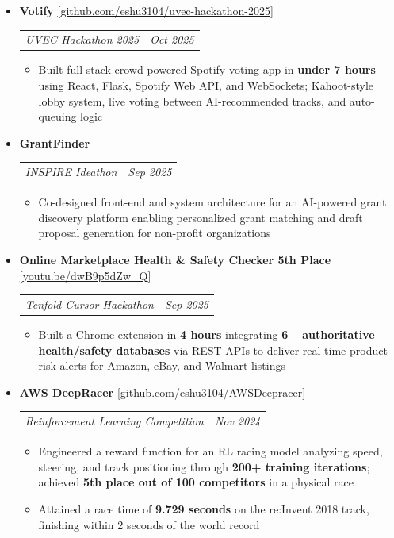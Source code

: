 \documentclass[10pt,letterpaper]{article}
\makeatletter
\newcommand{\resumeProjectHeading}[5]{%
  \vspace{5pt}%
  \item[]%
    {\small \textbf{#1} \enspace \href{#5}{\textcolor{accentblue}{[\underline{#2}]}}}\\[2pt]%
    {\small \begin{tabular*}{0.99\textwidth}{l@{\extracolsep{\fill}}r}%
      \textcolor{midgray}{\textit{\hspace{2pt}#3}} & \textcolor{midgray}{\textit{#4}}%
    \end{tabular*}}%
  \vspace{3pt}%
}
\newcommand{\resumeProjectHeadingNoLink}[3]{%
  \vspace{5pt}%
  \item[]%
    {\small \textbf{#1}}\\[2pt]%
    {\small \begin{tabular*}{0.99\textwidth}{l@{\extracolsep{\fill}}r}%
      \textcolor{midgray}{\textit{\hspace{2pt}#2}} & \textcolor{midgray}{\textit{#3}}%
    \end{tabular*}}%
  \vspace{3pt}%
}
\newcommand{\resumeItem}[1]{
  \item {\small #1}
}
\makeatother
\begin{document}
\begin{itemize}[leftmargin=0in, label={}]
  \resumeProjectHeading
    {Votify}{github.com/eshu3104/uvec-hackathon-2025}
    {UVEC Hackathon 2025}
    {Oct 2025}
    {https://github.com/eshu3104/uvec-hackathon-2025}
  \begin{itemize}
    \resumeItem{Built full-stack crowd-powered Spotify voting app in \textbf{under 7 hours} using React, Flask, Spotify Web API, and WebSockets; Kahoot-style lobby system, live voting between AI-recommended tracks, and auto-queuing logic}
  \end{itemize}

  \resumeProjectHeadingNoLink
    {GrantFinder}
    {INSPIRE Ideathon}
    {Sep 2025}
  \begin{itemize}
    \resumeItem{Co-designed front-end and system architecture for an AI-powered grant discovery platform enabling personalized grant matching and draft proposal generation for non-profit organizations}
  \end{itemize}

  \resumeProjectHeading
    {Online Marketplace Health \& Safety Checker \enspace \textbf{5th Place}}{youtu.be/dwB9p5dZw\_Q}
    {Tenfold Cursor Hackathon}
    {Sep 2025}
    {https://youtu.be/dwB9p5dZw_Q}
  \begin{itemize}
    \resumeItem{Built a Chrome extension in \textbf{4 hours} integrating \textbf{6+ authoritative health/safety databases} via REST APIs to deliver real-time product risk alerts for Amazon, eBay, and Walmart listings}
  \end{itemize}

  \resumeProjectHeading
    {AWS DeepRacer}{github.com/eshu3104/AWSDeepracer}
    {Reinforcement Learning Competition}
    {Nov 2024}
    {https://github.com/eshu3104/AWSDeepracer}
  \begin{itemize}
    \resumeItem{Engineered a reward function for an RL racing model analyzing speed, steering, and track positioning through \textbf{200+ training iterations}; achieved \textbf{5th place out of 100 competitors} in a physical race}
    \resumeItem{Attained a race time of \textbf{9.729 seconds} on the re:Invent 2018 track, finishing within 2 seconds of the world record}
  \end{itemize}

\end{itemize}

\end{document}
